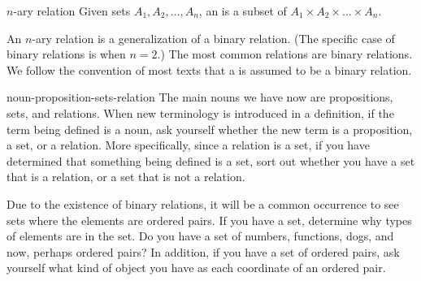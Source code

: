 \documentclass{book}
\theoremstyle{ekimcustom}
\newcommand\defn[1]{{\color{blue}{\bf #1}}}
\begin{document}
\begin{bdefinition}{$n$-ary relation}{}
Given sets $A_1,A_2,\dots,A_n$, an \defn{$n$-ary relation} is a subset of $A_1 \times A_2 \times \dots \times A_n$.
\end{bdefinition}
An $n$-ary relation is a generalization of a binary relation. (The specific case of binary relations is when $n=2$.) The most common relations are binary relations. We follow the convention of most texts that a \defn{relation} is assumed to be a binary relation.
\begin{bhabit}{}{noun-proposition-sets-relation}
The main nouns we have now are propositions, sets, and relations. When new terminology is introduced in a definition, if the term being defined is a noun, ask yourself whether the new term is a proposition, a set, or a relation. More specifically, since a relation is a set, if you have determined that something being defined is a set, sort out whether you have a set that is a relation, or a set that is not a relation.
\end{bhabit}
Due to the existence of binary relations, it will be a common occurrence to see sets where the elements are ordered pairs. If you have a set, determine why types of elements are in the set. Do you have a set of numbers, functions, dogs, and now, perhaps ordered pairs? In addition, if you have a set of ordered pairs, ask yourself what kind of object you have as each coordinate of an ordered pair.
\end{document}
